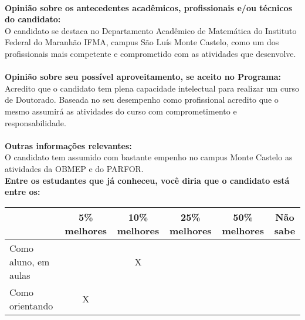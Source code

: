 \documentclass[11pt]{article}
\begin{document}
\\
\textbf{Opinião sobre os antecedentes acadêmicos, profissionais e/ou técnicos do candidato:}
\\O candidato se destaca no Departamento Acadêmico de Matemática do Instituto Federal do Maranhão IFMA, campus São Luís Monte Castelo, como um dos profissionais mais  competente e comprometido com as atividades que desenvolve.\\
\\
\textbf{Opinião sobre seu possível aproveitamento, se aceito no Programa:}
\\Acredito que o candidato tem plena capacidade intelectual para realizar um curso de Doutorado. Baseada no seu desempenho como profissional acredito que o mesmo assumirá as atividades do curso com comprometimento e responsabilidade.\\ 
\\
\textbf{Outras informações relevantes:} \\O candidato tem assumido com bastante empenho no campus Monte Castelo as atividades da OBMEP e do PARFOR.
\\[0.3cm]
\textbf{Entre os estudantes que já conheceu, você diria que o candidato está entre os:}
\\
\begin{tabular}{|l|c|c|c|c|c|}
\hline
 & 5\% melhores & 10\% melhores & 25\% melhores & 50\% melhores & Não sabe \\
\hline
Como aluno, em aulas &  & X &  &  & \\
\hline
Como orientando & X &  &  &  & \\
\hline
\end{tabular}
\end{document}
